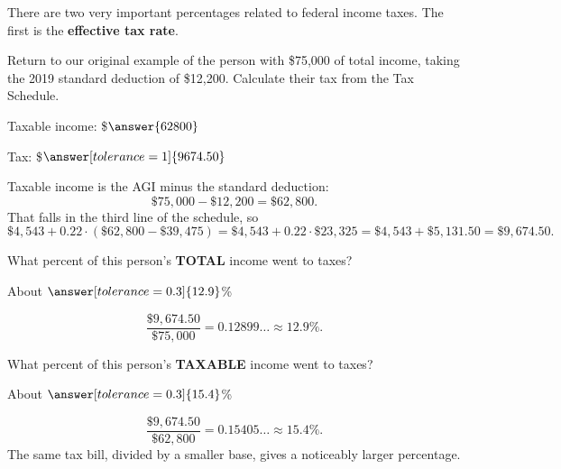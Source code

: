 \documentclass[12pt]{ximera}
\begin{document}
There are two very important percentages related to federal income taxes. The first is
the \textbf{effective tax rate}.

\begin{problem}
Return to our original example of the person with \$75,000 of total income, taking the
2019 standard deduction of \$12,200. Calculate their tax from the Tax Schedule.

Taxable income: \$$\answer{62800}$

Tax: \$$\answer[tolerance=1]{9674.50}$

\begin{solution}
Taxable income is the AGI minus the standard deduction:
\[
\$75{,}000 - \$12{,}200 = \$62{,}800.
\]
That falls in the third line of the schedule, so
\[
\$4{,}543 + 0.22 \cdot (\$62{,}800 - \$39{,}475) = \$4{,}543 + 0.22 \cdot \$23{,}325
= \$4{,}543 + \$5{,}131.50 = \$9{,}674.50.
\]
\end{solution}
\end{problem}

\begin{problem}
What percent of this person's \textbf{TOTAL} income went to taxes?

About $\answer[tolerance=0.3]{12.9}$\%

\begin{solution}
\[
\frac{\$9{,}674.50}{\$75{,}000} = 0.12899\ldots \approx 12.9\%.
\]
\end{solution}
\end{problem}

\begin{problem}
What percent of this person's \textbf{TAXABLE} income went to taxes?

About $\answer[tolerance=0.3]{15.4}$\%

\begin{solution}
\[
\frac{\$9{,}674.50}{\$62{,}800} = 0.15405\ldots \approx 15.4\%.
\]
The same tax bill, divided by a smaller base, gives a noticeably larger percentage.
\end{solution}
\end{problem}
\end{document}
